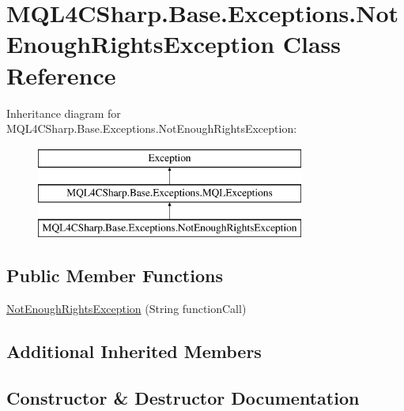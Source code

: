 \hypertarget{class_m_q_l4_c_sharp_1_1_base_1_1_exceptions_1_1_not_enough_rights_exception}{}\section{M\+Q\+L4\+C\+Sharp.\+Base.\+Exceptions.\+Not\+Enough\+Rights\+Exception Class Reference}
\label{class_m_q_l4_c_sharp_1_1_base_1_1_exceptions_1_1_not_enough_rights_exception}
Inheritance diagram for M\+Q\+L4\+C\+Sharp.\+Base.\+Exceptions.\+Not\+Enough\+Rights\+Exception\+:\begin{figure}[H]
\begin{center}
\leavevmode
\includegraphics[height=3.000000cm]{class_m_q_l4_c_sharp_1_1_base_1_1_exceptions_1_1_not_enough_rights_exception}
\end{center}
\end{figure}
\subsection*{Public Member Functions}
\begin{DoxyCompactItemize}
\item 
\hyperlink{class_m_q_l4_c_sharp_1_1_base_1_1_exceptions_1_1_not_enough_rights_exception_a7f73f455a40c497df618314977a05d82}{Not\+Enough\+Rights\+Exception} (String function\+Call)
\end{DoxyCompactItemize}
\subsection*{Additional Inherited Members}


\subsection{Constructor \& Destructor Documentation}
